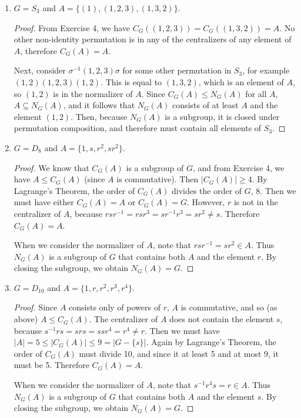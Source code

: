 \documentclass{article}
\begin{document}
\begin{enumerate}[label=(\alph*)]
    \item $G = S_3$ and $A = \{ (1), (1, 2, 3), (1, 3, 2) \}$.
          \begin{proof}
            From Exercise 4, we have $C_G((1, 2, 3)) = C_G((1, 3, 2)) = A$. No other non-identity permutation is in any of the centralizers of any element of $A$, therefore $C_G(A) = A$.

            Next, consider $\sigma^{-1}(1, 2, 3)\sigma$ for some other permutation in $S_3$, for example $(1, 2)(1, 2, 3)(1, 2)$. This is equal to $(1, 3, 2)$, which is an element of $A$, so $(1, 2)$ is in the normalizer of $A$. Since $C_G(A) \leq N_G(A)$ for all $A$, $A \subseteq N_G(A)$, and it follows that $N_G(A)$ consists of at least $A$ and the element $(1, 2)$. Then, because $N_G(A)$ is a subgroup, it is closed under permutation composition, and therefore must contain all elements of $S_3$.
          \end{proof}
    \item $G = D_8$ and $A = \{ 1, s, r^2, sr^2 \}$.
          \begin{proof}
            We know that $C_G(A)$ is a subgroup of $G$, and from Exercise 4, we have $A \leq C_G(A)$ (since $A$ is commutative). Then $|C_G(A)| \geq 4$. By Lagrange's Theorem, the order of $C_G(A)$ divides the order of $G$, 8. Then we must have either $C_G(A) = A$ or $C_G(A) = G$. However, $r$ is not in the centralizer of $A$, because $rsr^{-1} = rsr^3 = sr^{-1}r^3 = sr^2 \neq s$. Therefore $C_G(A) = A$.

            When we consider the normalizer of $A$, note that $rsr^{-1} = sr^2 \in A$. Thus $N_G(A)$ is a subgroup of $G$ that contains both $A$ and the element $r$. By closing the subgroup, we obtain $N_G(A) = G$.
          \end{proof}
    \item $G = D_{10}$ and $A = \{ 1, r, r^2, r^3, r^4 \}$.
          \begin{proof}
            Since $A$ consists only of powers of $r$, $A$ is commutative, and so (as above) $A \leq C_G(A)$. The centralizer of $A$ does not contain the element $s$, because $s^{-1}rs = srs = ssr^4 = r^4 \neq r$. Then we must have $|A| = 5 \leq |C_G(A)| \leq 9 = |G - \{ s \}|$. Again by Lagrange's Theorem, the order of $C_G(A)$ must divide 10, and since it at least 5 and at most 9, it must be 5. Therefore $C_G(A) = A$.

            When we consider the normalizer of $A$, note that $s^{-1}r^4s = r \in A$. Thus $N_G(A)$ is a subgroup of $G$ that contains both $A$ and the element $s$. By closing the subgroup, we obtain $N_G(A) = G$.
          \end{proof}
\end{enumerate}
\end{document}
